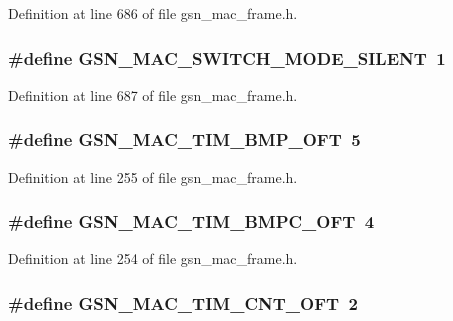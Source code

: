 Definition at line 686 of file gsn\_\-mac\_\-frame.h.

\hypertarget{a00523_a7ac9be1cd3437b90b96909bfafe3c460}{
\subsubsection[{GSN\_\-MAC\_\-SWITCH\_\-MODE\_\-SILENT}]{\setlength{\rightskip}{0pt plus 5cm}\#define GSN\_\-MAC\_\-SWITCH\_\-MODE\_\-SILENT~1}}
\label{a00523_a7ac9be1cd3437b90b96909bfafe3c460}


Definition at line 687 of file gsn\_\-mac\_\-frame.h.

\hypertarget{a00523_acb812103c6fa3cdb90b96a443e3a318b}{
\subsubsection[{GSN\_\-MAC\_\-TIM\_\-BMP\_\-OFT}]{\setlength{\rightskip}{0pt plus 5cm}\#define GSN\_\-MAC\_\-TIM\_\-BMP\_\-OFT~5}}
\label{a00523_acb812103c6fa3cdb90b96a443e3a318b}


Definition at line 255 of file gsn\_\-mac\_\-frame.h.

\hypertarget{a00523_a8b598c336e337983e7c2bee675cefe06}{
\subsubsection[{GSN\_\-MAC\_\-TIM\_\-BMPC\_\-OFT}]{\setlength{\rightskip}{0pt plus 5cm}\#define GSN\_\-MAC\_\-TIM\_\-BMPC\_\-OFT~4}}
\label{a00523_a8b598c336e337983e7c2bee675cefe06}


Definition at line 254 of file gsn\_\-mac\_\-frame.h.

\hypertarget{a00523_a5cda601bb3fc51b443d9a0a9ab34e5bf}{
\subsubsection[{GSN\_\-MAC\_\-TIM\_\-CNT\_\-OFT}]{\setlength{\rightskip}{0pt plus 5cm}\#define GSN\_\-MAC\_\-TIM\_\-CNT\_\-OFT~2}}
\label{a00523_a5cda601bb3fc51b443d9a0a9ab34e5bf}


